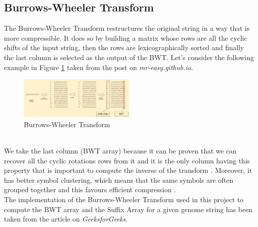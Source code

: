 \documentclass[final,5p,times,twocolumn,authoryear]{elsarticle}
\begin{document}
\subsection{Burrows-Wheeler Transform}
The Burrows-Wheeler Transform restructures the original string in a way that is more compressible. It does so by building a matrix whose rows are all the cyclic shifts of the input string, then the rows are lexicographically sorted and finally the last column is selected as the output of the BWT.
Let's consider the following example in Figure \ref{fig:bwt-label} taken from the post on \emph{mr-easy.github.io}\cite{mreasy}.
\begin{figure}
   \centering
   \includegraphics[width=0.5\textwidth]{images/bwt.png}
   \caption{Burrows-Wheeler Transform}
   \label{fig:bwt-label}
\end{figure}
\\ We take the last column (BWT array) because it can be proven that we can recover all the cyclic rotations rows from it and it is the only column having this property that is important to compute the inverse of the transform \cite{geeks}. Moreover, it has better symbol clustering, which means that the same symbols are often grouped together and this favours efficient compression \cite{geeks}. \\
The implementation\cite{bwt.h me} of the Burrows-Wheeler Transform used in this project to compute the BWT array and the Suffix Array for a given genome string has been taken from the article on \emph{GeeksforGeeks}\cite{geeks}.
\end{document}
